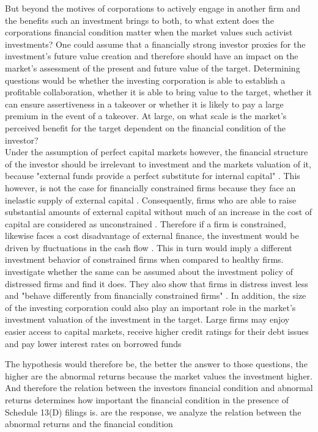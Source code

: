 \documentclass[12pt]{article}
\begin{document}
But beyond the motives of corporations to actively engage in another firm and the benefits such an investment brings to both, to what extent does the corporations financial condition matter when the market values such activist investments?  One could assume that a financially strong investor proxies for the investment's future value creation and therefore should have an impact on the market's assessment of the present and future value of the target. Determining questions would be whether the investing corporation is able to establish a profitable collaboration, whether it is able to bring value to the target, whether it can ensure assertiveness in a takeover or whether it is likely to pay a large premium in the event of a takeover. At large, on what scale is the market's perceived benefit for the target dependent on the financial condition of the investor?\\
Under the assumption of perfect capital markets however, the financial structure of the investor should be irrelevant to investment and the markets valuation of it, because "external funds provide a perfect substitute for internal capital" \citep[p. 141]{Fazzari2016}. This however, is not the case for financially constrained firms because they face an inelastic supply of external capital \citep[p.1]{Farre-mensa2013}. Consequently, firms who are able to raise substantial amounts of external capital without much of an increase in the cost of capital are considered as unconstrained \citep[p.1]{Farre-mensa2013}. Therefore if a firm is constrained, likewise faces a cost disadvantage of external finance, the investment would be driven by fluctuations in the cash flow \citep[p. 142]{Fazzari1988} . This in turn would imply a different investment behavior of constrained firms when compared to healthy firms. \\
\citet[p.450]{Bhagat2005} investigate whether the same can be assumed about the investment policy of distressed firms and find it does. They also show that firms in distress invest less and "behave differently from financially constrained firms" \citep[p.461]{Bhagat2005}. 
In addition, the size of the investing corporation could also play an important role in the market's investment valuation of the investment in the target. Large firms may enjoy easier access to capital markets, receive higher credit ratings for their debt issues and pay lower interest rates on borrowed funds \citep{Saquido2003}





The hypothesis would therefore be, the better the answer to those questions, the higher are the abnormal returns because the market values the investment higher. And therefore the relation between the investors financial condition and abnormal returns determines how important the financial condition in the presence of Schedule 13(D) filings is. are the response, we analyze the relation between the abnormal returns and the financial condition
\end{document}
